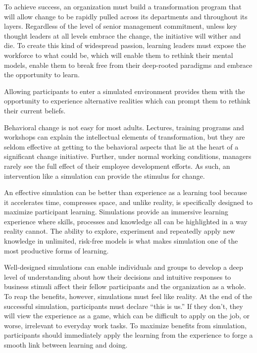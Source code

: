 \documentclass[UTF8,11pt]{ctexart}
\begin{document}
To achieve success, an organization must build a transformation program that will allow change to be rapidly pulled across its departments and throughout its layers. Regardless of the level of senior management commitment, unless key thought leaders at all levels embrace the change, the initiative will wither and die. To create this kind of widespread passion, learning leaders must expose the workforce to what could be, which will enable them to rethink their mental models, enable them to break free from their deep-rooted paradigms and embrace the opportunity to learn.


Allowing participants to enter a simulated environment provides them with the opportunity to experience alternative realities which can prompt them to rethink their current beliefs.


Behavioral change is not easy for most adults. Lectures, training programs and workshops can explain the intellectual elements of transformation, but they are seldom effective at getting to the behavioral aspects that lie at the heart of a significant change initiative. Further, under normal working conditions, managers rarely see the full effect of their employee development efforts. As such, an intervention like a simulation can provide the stimulus for change.


An effective simulation can be better than experience as a learning tool because it accelerates time, compresses space, and unlike reality, is specifically designed to maximize participant learning. Simulations provide an immersive learning experience where skills, processes and knowledge all can be highlighted in a way reality cannot. The ability to explore, experiment and repeatedly apply new knowledge in unlimited, risk-free models is what makes simulation one of the most productive forms of learning.


Well-designed simulations can enable individuals and groups to develop a deep level of understanding about how their decisions and intuitive responses to business stimuli affect their fellow participants and the organization as a whole. To reap the benefits, however, simulations must feel like reality. At the end of the successful simulation, participants must declare “this is us.” If they don’t, they will view the experience as a game, which can be difficult to apply on the job, or worse, irrelevant to everyday work tasks. To maximize benefits from simulation, participants should immediately apply the learning from the experience to forge a smooth link between learning and doing.
\end{document}
